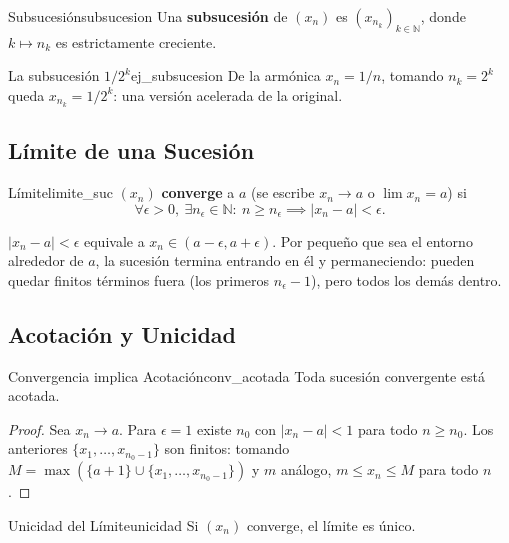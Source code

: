 \documentclass[11pt, a4paper]{article}
\begin{document}
\begin{definicion}{Subsucesión}{subsucesion}
Una \textbf{subsucesión} de $(x_n)$ es $(x_{n_k})_{k \in \mathbb{N}}$, donde $k \mapsto n_k$ es
estrictamente creciente.
\end{definicion}

\begin{ejemplo}{La subsucesión $1/2^k$}{ej_subsucesion}
De la armónica $x_n = 1/n$, tomando $n_k = 2^k$ queda $x_{n_k} = 1/2^k$: una versión acelerada
de la original.
\end{ejemplo}

\subsection{Límite de una Sucesión}

\begin{definicion}{Límite}{limite_suc}
$(x_n)$ \textbf{converge} a $a$ (se escribe $x_n \to a$ o $\lim x_n = a$) si
$$ \forall \epsilon > 0, \ \exists n_\epsilon \in \mathbb{N} : \ n \ge n_\epsilon \implies |x_n - a|
< \epsilon. $$
\end{definicion}

$|x_n - a| < \epsilon$ equivale a $x_n \in (a - \epsilon, a + \epsilon)$. Por pequeño que sea el
entorno alrededor de $a$, la sucesión termina entrando en él y permaneciendo: pueden quedar
finitos términos fuera (los primeros $n_\epsilon - 1$), pero todos los demás dentro.

\subsection{Acotación y Unicidad}

\begin{proposicion}{Convergencia implica Acotación}{conv_acotada}
Toda sucesión convergente está acotada.
\end{proposicion}

\begin{proof}
Sea $x_n \to a$. Para $\epsilon = 1$ existe $n_0$ con $|x_n - a| < 1$ para todo $n \ge n_0$. Los
anteriores $\{x_1, \dots, x_{n_0-1}\}$ son finitos: tomando
$M = \max(\{a+1\} \cup \{x_1, \dots, x_{n_0-1}\})$ y $m$ análogo, $m \le x_n \le M$ para todo $n$.
\end{proof}

\begin{proposicion}{Unicidad del Límite}{unicidad}
Si $(x_n)$ converge, el límite es único.
\end{proposicion}
\end{document}
